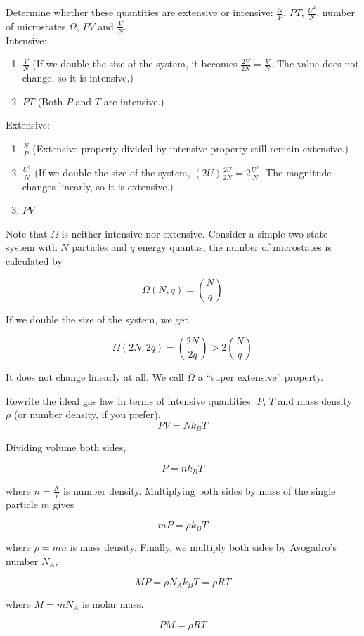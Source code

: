 \begin{texample}
	Determine whether these quantities are extensive or intensive: $\frac{N}{P}$, $PT$, $\frac{U^2}{N}$, number of microstates $\Omega$, $PV$ and $\frac{V}{N}$. \\
	
	Intensive:
	\begin{enumerate}
		\item $\frac{V}{N}$ (If we double the size of the system, it becomes $\frac{2V}{2N}=\frac{V}{N}$. The value does not change, so it is intensive.)
		\item $PT$ (Both $P$ and $T$ are intensive.)
	\end{enumerate}
	
	Extensive:
	\begin{enumerate}
		\item $\frac{N}{P}$ (Extensive property divided by intensive property still remain extensive.)
		\item $\frac{U^2}{N}$ (If we double the size of the system, $(2U)\frac{2U}{2N}=2\frac{U^2}{N}$. The magnitude changes linearly, so it is extensive.)
		\item $PV$
	\end{enumerate}
	
	Note that $\Omega$ is neither intensive nor extensive. Consider a simple two state system with $N$ particles and $q$ energy quantas, the number of microstates is calculated by
	
	\[\Omega(N,q)={N \choose q}\]
	
	If we double the size of the system, we get
	
	\[\Omega(2N,2q)={2N \choose 2q}>2{N \choose q}\]
	
	It does not change linearly at all. We call $\Omega$ a ``super extensive'' property.
\end{texample}

\begin{texample}
	Rewrite the ideal gas law in terms of intensive quantities: $P$, $T$ and mass density $\rho$ (or number density, if you prefer). \\
	
	\[PV=Nk_BT\]
	
	Dividing volume both sides,
	
	\[P=nk_BT\]
	
	where $n=\frac{N}{V}$ is number density. Multiplying both sides by mass of the single particle $m$ gives
	
	\[mP=\rho k_BT\]
	
	where $\rho=mn$ is mass density. Finally, we multiply both sides by Avogadro's number $N_A$,
	
	\[MP=\rho N_A k_B T=\rho RT\]
	
	where $M=mN_A$ is molar mass.
	
	\[\boxed{PM=\rho RT}\]
\end{texample}

